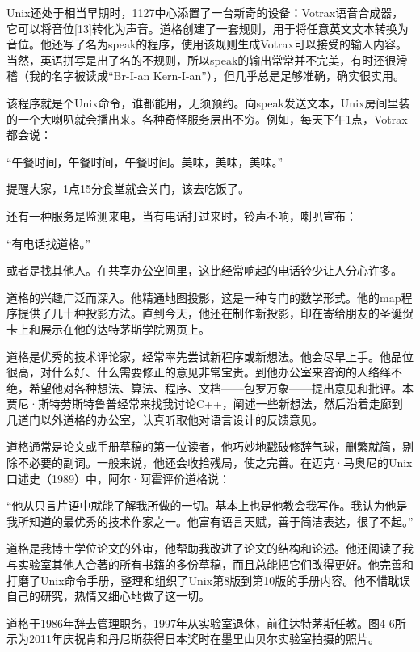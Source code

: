 \documentclass[a4paper,12pt,UTF8,twoside]{ctexbook}
\begin{document}
{Unix还处于相当早期时，1127中心添置了一台新奇的设备：Votrax语音合成器，它可以将音位[13]转化为声音。道格创建了一套规则，用于将任意英文文本转换为音位。他还写了名为speak的程序，使用该规则生成Votrax可以接受的输入内容。当然，英语拼写是出了名的不规则，所以speak的输出常常并不完美，有时还很滑稽（我的名字被读成“Br-I-an Kern-I-an”），但几乎总是足够准确，确实很实用。

该程序就是个Unix命令，谁都能用，无须预约。向speak发送文本，Unix房间里装的一个大喇叭就会播出来。各种奇怪服务层出不穷。例如，每天下午1点，Votrax都会说：

“午餐时间，午餐时间，午餐时间。美味，美味，美味。”



提醒大家，1点15分食堂就会关门，该去吃饭了。

还有一种服务是监测来电，当有电话打过来时，铃声不响，喇叭宣布：

“有电话找道格。”



或者是找其他人。在共享办公空间里，这比经常响起的电话铃少让人分心许多。

道格的兴趣广泛而深入。他精通地图投影，这是一种专门的数学形式。他的map程序提供了几十种投影方法。直到今天，他还在制作新投影，印在寄给朋友的圣诞贺卡上和展示在他的达特茅斯学院网页上。

道格是优秀的技术评论家，经常率先尝试新程序或新想法。他会尽早上手。他品位很高，对什么好、什么需要修正的意见非常宝贵。到他办公室来咨询的人络绎不绝，希望他对各种想法、算法、程序、文档——包罗万象——提出意见和批评。本贾尼·斯特劳斯特鲁普经常来找我讨论C++，阐述一些新想法，然后沿着走廊到几道门以外道格的办公室，认真听取他对语言设计的反馈意见。

道格通常是论文或手册草稿的第一位读者，他巧妙地戳破修辞气球，删繁就简，剔除不必要的副词。一般来说，他还会收拾残局，使之完善。在迈克·马奥尼的Unix口述史（1989）中，阿尔·阿霍评价道格说：

“他从只言片语中就能了解我所做的一切。基本上也是他教会我写作。我认为他是我所知道的最优秀的技术作家之一。他富有语言天赋，善于简洁表达，很了不起。”



道格是我博士学位论文的外审，他帮助我改进了论文的结构和论述。他还阅读了我与实验室其他人合著的所有书籍的多份草稿，而且总能把它们改得更好。他完善和打磨了Unix命令手册，整理和组织了Unix第8版到第10版的手册内容。他不惜耽误自己的研究，热情又细心地做了这一切。

道格于1986年辞去管理职务，1997年从实验室退休，前往达特茅斯任教。图4-6所示为2011年庆祝肯和丹尼斯获得日本奖时在墨里山贝尔实验室拍摄的照片。



}
\end{document}
